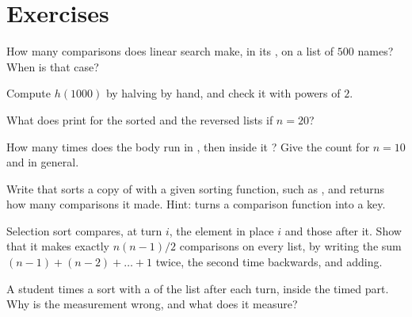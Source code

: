 \section{Exercises}\label{sec:g11:cost-of-an-algorithm:exercises}

\begin{exercise}[$\star$]\label{exo:g11:cost-of-an-algorithm:1}
How many comparisons does linear search make, in its , on a list of $500$ names? When is that case?
\end{exercise}

\begin{exercise}[$\star$]\label{exo:g11:cost-of-an-algorithm:2}
Compute $h(1000)$ by halving by hand, and check it with powers of $2$.
\end{exercise}

\begin{exercise}[$\star$]\label{exo:g11:cost-of-an-algorithm:3}
What does  print for the sorted and the reversed lists if $n = 20$?
\end{exercise}

\begin{exercise}[$\star$]\label{exo:g11:cost-of-an-algorithm:4}
How many times does the body run in , then inside it ? Give the count
for $n = 10$ and in general.
\end{exercise}

\begin{exercise}[$\star$]\label{exo:g11:cost-of-an-algorithm:5}
Write  that sorts a copy of  with a given sorting function, such as
, and returns how many comparisons it made. Hint:  turns a comparison function
into a key.
\end{exercise}

\begin{exercise}[$\star\star$]\label{exo:g11:cost-of-an-algorithm:6}
Selection sort compares, at turn $i$, the element in place $i$ and those after it. Show that it makes exactly
$n(n-1)/2$ comparisons on every list, by writing the sum $(n-1) + (n-2) + \dots + 1$ twice, the second time backwards,
and adding.
\end{exercise}

\begin{exercise}[$\star\star$]\label{exo:g11:cost-of-an-algorithm:7}
A student times a sort with a  of the list after each turn, inside the timed part. Why is the measurement
wrong, and what does it measure?
\end{exercise}

